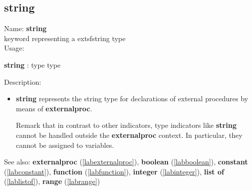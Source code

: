 \subsection{string}
\label{labstring}
\noindent Name: \textbf{string}\\
keyword representing a 	extsf{string} type \\
\noindent Usage: 
\begin{center}
\textbf{string} : \textsf{type type}
\end{center}
\noindent Description: \begin{itemize}

\item \textbf{string} represents the \textsf{string} type for declarations
   of external procedures by means of \textbf{externalproc}.
    
   Remark that in contrast to other indicators, type indicators like
   \textbf{string} cannot be handled outside the \textbf{externalproc} context.  In
   particular, they cannot be assigned to variables.
\end{itemize}
See also: \textbf{externalproc} (\ref{labexternalproc}), \textbf{boolean} (\ref{labboolean}), \textbf{constant} (\ref{labconstant}), \textbf{function} (\ref{labfunction}), \textbf{integer} (\ref{labinteger}), \textbf{list of} (\ref{lablistof}), \textbf{range} (\ref{labrange})
